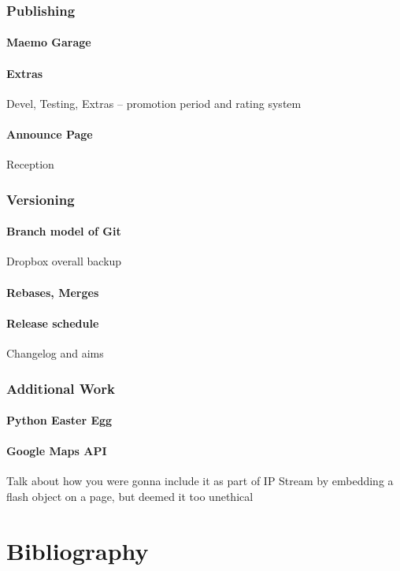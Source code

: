 \documentclass[11pt]{article} %
\begin{document}
\section{Publishing}
\subsection{Maemo Garage}
\subsection{Extras}{Devel, Testing, Extras -- promotion period and rating system}
\subsection{Announce Page}{Reception}

\section{Versioning}
\subsection{Branch model of Git}{Dropbox overall backup}
\subsection{Rebases, Merges}
\subsection{Release schedule}{Changelog and aims}

\section{Additional Work}
\subsection{Python Easter Egg}
\subsection{Google Maps API}{Talk about how you were gonna include it as part of IP Stream by embedding a flash object on a page, but deemed it too unethical}

\part{Bibliography}
\end{document}
